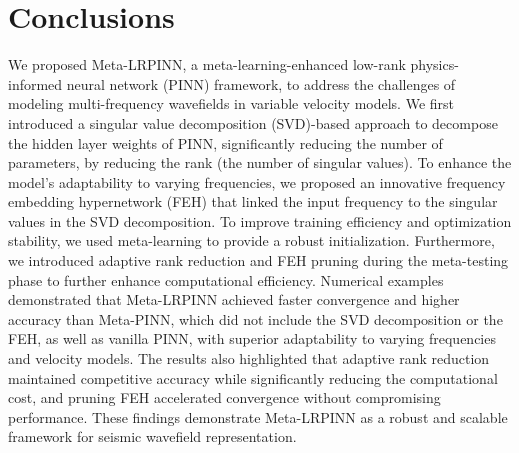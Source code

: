 \section{\textbf{Conclusions}}\label{conclusions}
We proposed Meta-LRPINN, a meta-learning-enhanced low-rank physics-informed neural network (PINN) framework, to address the challenges of modeling multi-frequency wavefields in variable velocity models. We first introduced a singular value decomposition (SVD)-based approach to decompose the hidden layer weights of PINN, significantly reducing the number of parameters, by reducing the rank (the number of singular values). To enhance the model's adaptability to varying frequencies, we proposed an innovative frequency embedding hypernetwork (FEH) that linked the input frequency to the singular values in the SVD decomposition. To improve training efficiency and optimization stability, we used meta-learning to provide a robust initialization. Furthermore, we introduced adaptive rank reduction and FEH pruning during the meta-testing phase to further enhance computational efficiency. Numerical examples demonstrated that Meta-LRPINN achieved faster convergence and higher accuracy than Meta-PINN, which did not include the SVD decomposition or the FEH, as well as vanilla PINN, with superior adaptability to varying frequencies and velocity models. The results also highlighted that adaptive rank reduction maintained competitive accuracy while significantly reducing the computational cost, and pruning FEH accelerated convergence without compromising performance. These findings demonstrate Meta-LRPINN as a robust and scalable framework for seismic wavefield representation.
